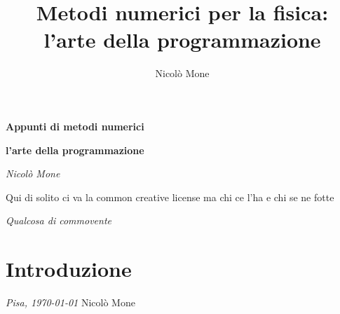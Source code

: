\documentclass[12pt, twoside]{book}
\title{Metodi numerici per la fisica: \\ l'arte della programmazione}
\author{Nicolò Mone}
\begin{document}
	
	
	\begin{titlepage}
		\centering
		\vspace*{3cm}
		{\huge\bfseries Appunti di metodi numerici \par}
		{\Large\bfseries l'arte della programmazione \par}
		\vspace{2cm}
		{\Large\itshape Nicolò Mone\par}
				
		\vfill
	\end{titlepage}
	\pagestyle{empty}
	\vspace*{\fill}
	Qui di solito ci va la common creative license ma chi ce l'ha e chi se ne fotte
	\cleardoublepage
	\vspace*{8cm}
	\begin{center}
		\begin{flushright}
			\small\emph{Qualcosa di commovente
			}
		\end{flushright}
		\vspace*{\fill}
	\end{center}
	\cleardoublepage
	\pagestyle{fancy}
	
	
	\chapter*{Introduzione}
	
	
	
	\emph{Pisa, \today} \hfill Nicolò Mone
	
	
	\tableofcontents
	
	\newpage 
	
	
	
	\newpage 
	
	
	
	\newpage
	
	
	
	\newpage
	
	
	
	\newpage

	
	
	
	
	
	
	
	
	
	
	
	
	
	
	
	
	
	
	
	
	
	
	
	
	
\end{document}
